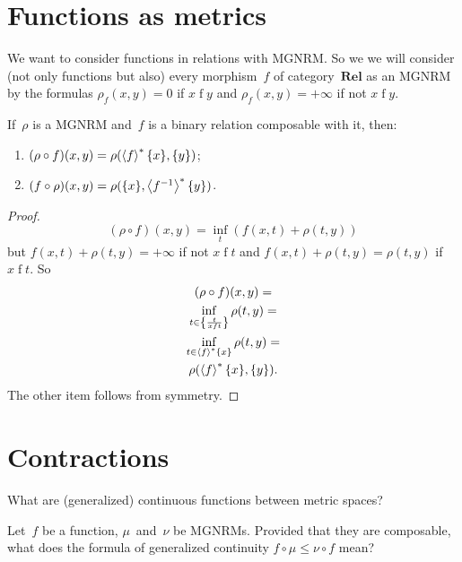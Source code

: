 
\section{Functions as metrics}

We want to consider functions in relations with MGNRM. So we we will consider (not only functions but also) every morphism~$f$ of category~$\mathbf{Rel}$ as an MGNRM by the formulas $\rho_{f}(x,y) = 0$ if $x\mathrel{f}y$ and $\rho_{f}(x,y) = +\infty$ if not $x\mathrel{f}y$.


\begin{thm}
If~$\rho$ is a MGNRM and~$f$ is a binary relation composable with it, then:
\begin{enumerate}
\item $(\rho\circ f)(x,y) = \rho(\left\langle f\right\rangle ^{\ast}\{x\},\{y\})$;
\item $(f\circ\rho)(x,y) = \rho(\{x\},\left\langle f^{-1}\right\rangle ^{\ast}\{y\})$.
\end{enumerate}
\end{thm}

\begin{proof}
~
\[
(\rho\circ f)(x,y) = \inf_{t}(f(x,t) + \rho(t,y))
\]
but $f(x,t) + \rho(t,y) = +\infty$ if not $x\mathrel{f}t$ and $f(x,t) + \rho(t,y) = \rho(t,y)$ if $x\mathrel{f}t$. So
\begin{multline*}
(\rho\circ f)(x,y) = \\
\inf_{t\in\left\{ \frac{t}{x\mathrel{f}t}\right\}}\rho(t,y) = \\
\inf_{t\in\left\langle f\right\rangle ^{\ast}\{x\}}\rho(t,y) = \\
\rho(\left\langle f\right\rangle ^{\ast}\{x\},\{y\}).
\end{multline*}
The other item follows from symmetry.
\end{proof}


\section{Contractions}

What are (generalized) continuous functions between metric spaces?

Let~$f$ be a function, $\mu$~and~$\nu$ be MGNRMs. Provided that they are composable, what does the formula of generalized continuity $f\circ\mu\leq\nu\circ f$ mean?

